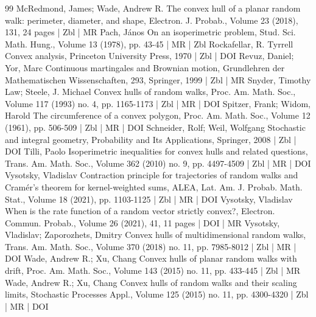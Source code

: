 \begin{thebibliography}{99}
McRedmond, James; Wade, Andrew R. The convex hull of a planar random walk: perimeter, diameter, and shape, Electron. J. Probab., Volume 23 (2018), 131, 24 pages | Zbl | MR
Pach, János On an isoperimetric problem, Stud. Sci. Math. Hung., Volume 13 (1978), pp. 43-45 | MR | Zbl
Rockafellar, R. Tyrrell Convex analysis, Princeton University Press, 1970 | Zbl | DOI
Revuz, Daniel; Yor, Marc Continuous martingales and Brownian motion, Grundlehren der Mathematischen Wissenschaften, 293, Springer, 1999 | Zbl | MR
Snyder, Timothy Law; Steele, J. Michael Convex hulls of random walks, Proc. Am. Math. Soc., Volume 117 (1993) no. 4, pp. 1165-1173 | Zbl | MR | DOI
Spitzer, Frank; Widom, Harold The circumference of a convex polygon, Proc. Am. Math. Soc., Volume 12 (1961), pp. 506-509 | Zbl | MR | DOI
Schneider, Rolf; Weil, Wolfgang Stochastic and integral geometry, Probability and Its Applications, Springer, 2008 | Zbl | DOI
Tilli, Paolo Isoperimetric inequalities for convex hulls and related questions, Trans. Am. Math. Soc., Volume 362 (2010) no. 9, pp. 4497-4509 | Zbl | MR | DOI
Vysotsky, Vladislav Contraction principle for trajectories of random walks and Cramér’s theorem for kernel-weighted sums, ALEA, Lat. Am. J. Probab. Math. Stat., Volume 18 (2021), pp. 1103-1125 | Zbl | MR | DOI
Vysotsky, Vladislav When is the rate function of a random vector strictly convex?, Electron. Commun. Probab., Volume 26 (2021), 41, 11 pages | DOI | MR
Vysotsky, Vladislav; Zaporozhets, Dmitry Convex hulls of multidimensional random walks, Trans. Am. Math. Soc., Volume 370 (2018) no. 11, pp. 7985-8012 | Zbl | MR | DOI
Wade, Andrew R.; Xu, Chang Convex hulls of planar random walks with drift, Proc. Am. Math. Soc., Volume 143 (2015) no. 11, pp. 433-445 | Zbl | MR
Wade, Andrew R.; Xu, Chang Convex hulls of random walks and their scaling limits, Stochastic Processes Appl., Volume 125 (2015) no. 11, pp. 4300-4320 | Zbl | MR | DOI
\end{thebibliography}

